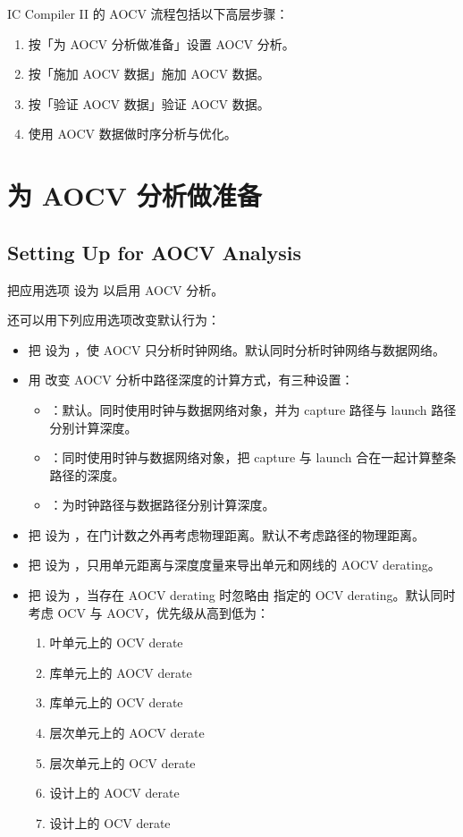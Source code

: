 IC Compiler II 的 AOCV 流程包括以下高层步骤：
\begin{enumerate}
  \item 按「为 AOCV 分析做准备」设置 AOCV 分析。
  \item 按「施加 AOCV 数据」施加 AOCV 数据。
  \item 按「验证 AOCV 数据」验证 AOCV 数据。
  \item 使用 AOCV 数据做时序分析与优化。
\end{enumerate}

\section{为 AOCV 分析做准备}
\subsection*{Setting Up for AOCV Analysis}

把应用选项  设为  以启用 AOCV 分析。

还可以用下列应用选项改变默认行为：
\begin{itemize}
  \item 把  设为 ，使 AOCV 只分析时钟网络。默认同时分析时钟网络与数据网络。
  \item 用  改变 AOCV 分析中路径深度的计算方式，有三种设置：
  \begin{itemize}
    \item {}：默认。同时使用时钟与数据网络对象，并为 capture 路径与 launch 路径分别计算深度。
    \item {}：同时使用时钟与数据网络对象，把 capture 与 launch 合在一起计算整条路径的深度。
    \item {}：为时钟路径与数据路径分别计算深度。
  \end{itemize}
  \item 把  设为 ，在门计数之外再考虑物理距离。默认不考虑路径的物理距离。
  \item 把  设为 ，只用单元距离与深度度量来导出单元和网线的 AOCV derating。
  \item 把  设为 ，当存在 AOCV derating 时忽略由  指定的 OCV derating。默认同时考虑 OCV 与 AOCV，优先级从高到低为：
  \begin{enumerate}
    \item 叶单元上的 OCV derate
    \item 库单元上的 AOCV derate
    \item 库单元上的 OCV derate
    \item 层次单元上的 AOCV derate
    \item 层次单元上的 OCV derate
    \item 设计上的 AOCV derate
    \item 设计上的 OCV derate
  \end{enumerate}
\end{itemize}

